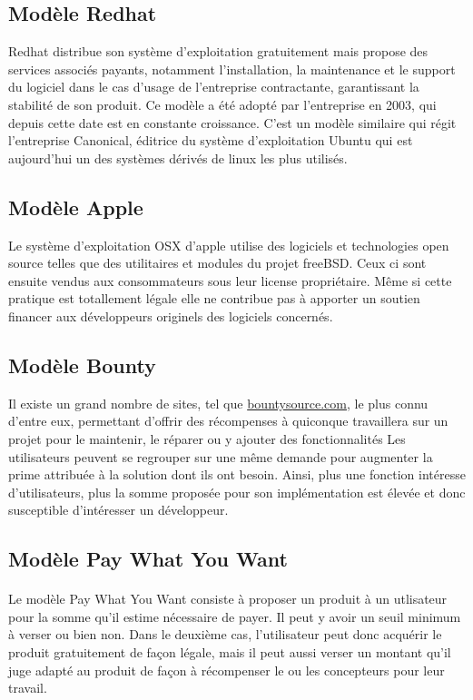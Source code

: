     \subsection{Modèle Redhat}

Redhat distribue son système d'exploitation gratuitement mais propose des 
services associés payants, notamment l'installation, la maintenance et le 
support du logiciel dans le cas d'usage de l'entreprise contractante, 
garantissant la stabilité de son produit.
Ce modèle a été adopté par l'entreprise en 2003, qui depuis cette date est en 
constante croissance.
C'est un modèle similaire qui régit l'entreprise Canonical, éditrice du 
système d'exploitation Ubuntu qui est aujourd'hui un des systèmes dérivés de 
linux les plus utilisés.

    \subsection{Modèle Apple}

Le système d'exploitation OSX d'apple utilise des logiciels et technologies 
open source telles que des utilitaires et modules du projet freeBSD\@.
Ceux ci sont ensuite vendus aux consommateurs sous leur license propriétaire. 
Même si cette pratique est totallement légale elle ne contribue pas à apporter 
un soutien financer aux développeurs originels des logiciels concernés.

    \subsection{Modèle Bounty}

Il existe un grand nombre de sites, tel que \url{bountysource.com}, le 
plus connu d'entre eux, permettant d'offrir des récompenses à quiconque 
travaillera sur un projet pour le maintenir, le réparer ou y ajouter des 
fonctionnalités
Les utilisateurs peuvent se regrouper sur une même demande pour augmenter la 
prime attribuée à la solution dont ils ont besoin.
Ainsi, plus une fonction intéresse d'utilisateurs, plus la somme proposée pour 
son implémentation est élevée et donc susceptible d'intéresser un développeur.

    \subsection{Modèle Pay What You Want}

    \paragraph{} Le modèle Pay What You Want consiste à proposer un produit à
    un utlisateur pour la somme qu'il estime nécessaire de payer. Il peut y
    avoir un seuil minimum à verser ou bien non. Dans le deuxième cas,
    l'utilisateur peut donc acquérir le produit gratuitement de façon légale,
    mais il peut aussi verser un montant qu'il juge adapté au produit de façon
    à récompenser le ou les concepteurs pour leur travail.

